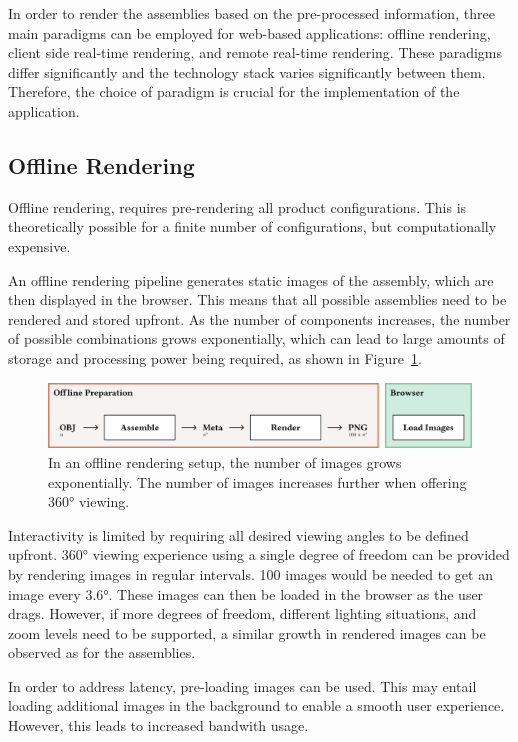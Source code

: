 In order to render the assemblies based on the pre-processed information, three main paradigms can be employed for web-based applications: offline rendering, client side real-time rendering, and remote real-time rendering. These paradigms differ significantly and the technology stack varies significantly between them. Therefore, the choice of paradigm is crucial for the implementation of the application.

\subsection*{Offline Rendering}

Offline rendering, requires pre-rendering all product configurations. This is theoretically possible for a finite number of configurations, but computationally expensive. 

An offline rendering pipeline generates static images of the assembly, which are then displayed in the browser. This means that all possible assemblies need to be rendered and stored upfront. As the number of components increases, the number of possible combinations grows exponentially, which can lead to large amounts of storage and processing power being required, as shown in Figure~\ref{fig:cad-offline}.

\begin{figure}[H]
  \includegraphics[width=\columnwidth]{resources/cad-pipeline-offline.png}
  \caption{In an offline rendering setup, the number of images grows exponentially. The number of images increases further when offering 360° viewing.}
  \label{fig:cad-offline}
\end{figure}

Interactivity is limited by requiring all desired viewing angles to be defined upfront. 360° viewing experience using a single degree of freedom can be provided by rendering images in regular intervals. 100 images would be needed to get an image every 3.6°. These images can then be loaded in the browser as the user drags. However, if more degrees of freedom, different lighting situations, and zoom levels need to be supported, a similar growth in rendered images can be observed as for the assemblies.

In order to address latency, pre-loading images can be used. This may entail loading additional images in the background to enable a smooth user experience. However, this leads to increased bandwith usage.

